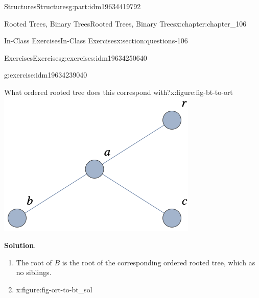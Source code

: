 \documentclass[oneside,10pt,]{book}
\newcommand{\blocktitlefont}{\relax}
\numberwithin{equation}{section}
\begin{document}
\begin{partptx}{Structures}{}{Structures}{}{}{g:part:idm19634419792}
\begin{chapterptx}{Rooted Trees, Binary Trees}{}{Rooted Trees, Binary Trees}{}{}{x:chapter:chapter_106}
\begin{sectionptx}{In-Class Exercises}{}{In-Class Exercises}{}{}{x:section:questions-106}
\begin{exercises-subsection-numberless}{Exercises}{}{Exercises}{}{}{g:exercises:idm19634250640}
\begin{exercisegroup}
\begin{divisionexerciseeg}{5}{}{}{g:exercise:idm19634239040}
\begin{sidebyside}{2}{0}{0}{0}
\begin{sbspanel}{0.5}
\begin{figureptx}{What ordered rooted tree does this correspond with?}{x:figure:fig-bt-to-ort}{}
\includegraphics[width=\linewidth]{images/fig-bt-to-ort.png}
\tcblower
\end{figureptx}%
\end{sbspanel}%
\end{sidebyside}%
\par\smallskip%
\noindent\textbf{\blocktitlefont Solution}.\hypertarget{g:solution:idm19634217648}{}\quad{}%
\begin{enumerate}[label=(\alph*)]
\item{}The root of \(B\) is the root of the corresponding ordered rooted tree, which as no siblings.%
\item{}\begin{figureptx}{}{x:figure:fig-ort-to-bt_sol}{}%
\begin{image}{0.3}{0.4}{0.3}%

\end{image}
\end{figureptx}
\end{enumerate}
\end{divisionexerciseeg}
\end{exercisegroup}
\end{exercises-subsection-numberless}
\end{sectionptx}
\end{chapterptx}
\end{partptx}
\end{document}
